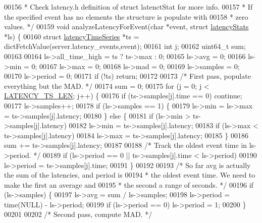 \begin{DoxyCode}
00156 \textcolor{comment}{ * Check latency.h definition of struct latenctStat for more info.}
00157 \textcolor{comment}{ * If the specified event has no elements the structure is populate with}
00158 \textcolor{comment}{ * zero values. */}
00159 \textcolor{keywordtype}{void} analyzeLatencyForEvent(\textcolor{keywordtype}{char} *event, \textcolor{keyword}{struct} \hyperlink{structlatencyStats}{latencyStats} *ls) \{
00160     \textcolor{keyword}{struct} \hyperlink{structlatencyTimeSeries}{latencyTimeSeries} *ts = dictFetchValue(server.latency\_events,event);
00161     \textcolor{keywordtype}{int} j;
00162     uint64\_t sum;
00163 
00164     ls->all\_time\_high = ts ? ts->max : 0;
00165     ls->avg = 0;
00166     ls->min = 0;
00167     ls->max = 0;
00168     ls->mad = 0;
00169     ls->samples = 0;
00170     ls->period = 0;
00171     \textcolor{keywordflow}{if} (!ts) \textcolor{keywordflow}{return};
00172 
00173     \textcolor{comment}{/* First pass, populate everything but the MAD. */}
00174     sum = 0;
00175     \textcolor{keywordflow}{for} (j = 0; j < \hyperlink{latency_8h_a7e3ba352d9d7bb4c88c2c42c16e6674b}{LATENCY\_TS\_LEN}; j++) \{
00176         \textcolor{keywordflow}{if} (ts->samples[j].time == 0) \textcolor{keywordflow}{continue};
00177         ls->samples++;
00178         \textcolor{keywordflow}{if} (ls->samples == 1) \{
00179             ls->min = ls->max = ts->samples[j].latency;
00180         \} \textcolor{keywordflow}{else} \{
00181             \textcolor{keywordflow}{if} (ls->min > ts->samples[j].latency)
00182                 ls->min = ts->samples[j].latency;
00183             \textcolor{keywordflow}{if} (ls->max < ts->samples[j].latency)
00184                 ls->max = ts->samples[j].latency;
00185         \}
00186         sum += ts->samples[j].latency;
00187 
00188         \textcolor{comment}{/* Track the oldest event time in ls->period. */}
00189         \textcolor{keywordflow}{if} (ls->period == 0 || ts->samples[j].time < ls->period)
00190             ls->period = ts->samples[j].time;
00191     \}
00192 
00193     \textcolor{comment}{/* So far avg is actually the sum of the latencies, and period is}
00194 \textcolor{comment}{     * the oldest event time. We need to make the first an average and}
00195 \textcolor{comment}{     * the second a range of seconds. */}
00196     \textcolor{keywordflow}{if} (ls->samples) \{
00197         ls->avg = sum / ls->samples;
00198         ls->period = time(NULL) - ls->period;
00199         \textcolor{keywordflow}{if} (ls->period == 0) ls->period = 1;
00200     \}
00201 
00202     \textcolor{comment}{/* Second pass, compute MAD. */}

\end{DoxyCode}
